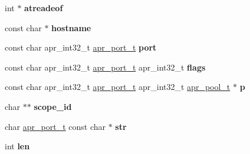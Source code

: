 \begin{DoxyCompactItemize}
\item 
\mbox{\label{group__apr__network__io_gabcfc2cbd257ea79c038f27c8b6270fc8}} 
int $\ast$ {\bfseries atreadeof}
\item 
\mbox{\label{group__apr__network__io_gaad01339e89106fdf68f57ef118956fa9}} 
const char $\ast$ {\bfseries hostname}
\item 
\mbox{\label{group__apr__network__io_ga1d291721eb4f85bd208877a6a4bd244d}} 
const char apr\+\_\+int32\+\_\+t \mbox{\hyperlink{group__apr__network__io_gaa670a71960f6eb4fe0d0de2a1e7aba03}{apr\+\_\+port\+\_\+t}} {\bfseries port}
\item 
\mbox{\label{group__apr__network__io_gaf3e301ea037769f1599df82f0739128c}} 
const char apr\+\_\+int32\+\_\+t \mbox{\hyperlink{group__apr__network__io_gaa670a71960f6eb4fe0d0de2a1e7aba03}{apr\+\_\+port\+\_\+t}} apr\+\_\+int32\+\_\+t {\bfseries flags}
\item 
\mbox{\label{group__apr__network__io_gaf2558b77531cabefe36d422e32e8b65d}} 
const char apr\+\_\+int32\+\_\+t \mbox{\hyperlink{group__apr__network__io_gaa670a71960f6eb4fe0d0de2a1e7aba03}{apr\+\_\+port\+\_\+t}} apr\+\_\+int32\+\_\+t \mbox{\hyperlink{group__apr__pools_gaf137f28edcf9a086cd6bc36c20d7cdfb}{apr\+\_\+pool\+\_\+t}} $\ast$ {\bfseries p}
\item 
\mbox{\label{group__apr__network__io_gac03f4c1705dcf958f913d4fdcaab00b5}} 
char $\ast$$\ast$ {\bfseries scope\+\_\+id}
\item 
\mbox{\label{group__apr__network__io_gafdbeb683c68838a611351fefebb0c935}} 
char \mbox{\hyperlink{group__apr__network__io_gaa670a71960f6eb4fe0d0de2a1e7aba03}{apr\+\_\+port\+\_\+t}} const char $\ast$ {\bfseries str}
\item 
\mbox{\label{group__apr__network__io_ga8572aae04e7b7c0126ebaef27ebd82e0}} 
int {\bfseries len}
\item 
\mbox{\label{group__apr__network__io_ga4e743d3613a3276658e10b191108c249}} 
$$
\end{DoxyCompactItemize}

